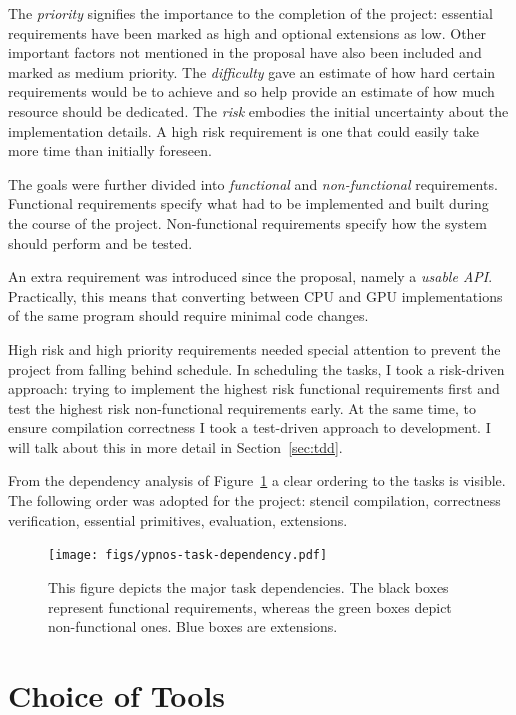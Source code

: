 \documentclass[
    12pt,
    a4paper,
    twoside,
    openright,
    ]{scrbook}
\begin{document}
The \emph{priority} signifies the importance to the completion of the project:
essential requirements have been marked as high and optional extensions as
low. Other important factors not mentioned in the proposal have also been
included and marked as medium priority. The \emph{difficulty} gave an estimate
of how hard certain requirements would be to achieve and so help provide an
estimate of how much resource should be dedicated. The \emph{risk} embodies the
initial uncertainty about the implementation details. A high risk requirement is
one that could easily take more time than initially foreseen.

The goals were further divided into \emph{functional} and \emph{non-functional}
requirements. Functional requirements specify what had to be implemented and
built during the course of the project. Non-functional requirements specify how
the system should perform and be tested.

An extra requirement was introduced since the proposal, namely a \emph{usable
  API}. Practically, this means that converting between CPU and GPU
implementations of the same program should require minimal code changes.

High risk and high priority requirements needed special attention to prevent the
project from falling behind schedule. In scheduling the tasks, I took a
risk-driven approach: trying to implement the highest risk functional
requirements first and test the highest risk non-functional requirements
early. At the same time, to ensure compilation correctness I took a test-driven
approach to development. I will talk about this in more detail in
Section~\ref{sec:tdd}.

From the dependency analysis of Figure~\ref{fig:task-dep} a clear ordering to
the tasks is visible. The following order was adopted for the project: stencil
compilation, correctness verification, essential primitives, evaluation,
extensions.

\begin{figure}[h]
  \centering
  \texttt{[image: figs/ypnos-task-dependency.pdf]}
  \caption{This figure depicts the major task dependencies. The black boxes
    represent functional requirements, whereas the green boxes depict
    non-functional ones. Blue boxes are extensions.}
  \label{fig:task-dep}
\end{figure}

\section{Choice of Tools}
\end{document}
